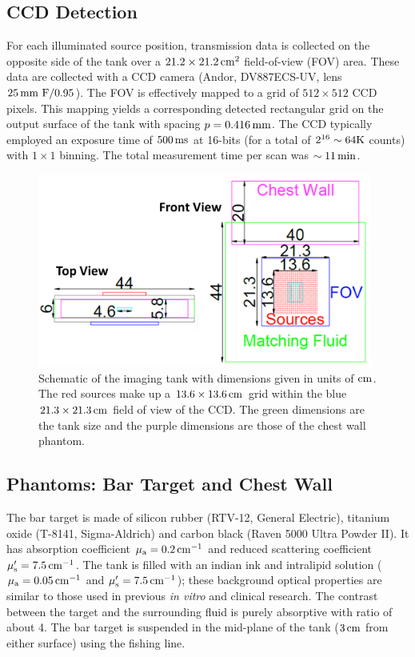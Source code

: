 \subsection{CCD Detection}
For each illuminated source position, transmission data is collected on the opposite side of the tank over a $21.2\times 21.2\,{\rm cm}^2$ field-of-view (FOV) area. These data are collected with a CCD camera (Andor, DV887ECS-UV, lens $25\,{\rm mm}\ {\rm F}/0.95$). The FOV is effectively mapped to a grid of $512\times 512$ CCD pixels. This mapping yields a corresponding detected rectangular grid on the output surface of the tank with spacing $p=0.416\,{\rm mm}$. The CCD typically employed an exposure time of $500\,\rm{ms}$ at 16-bits (for a total of $2^{16}\sim64\rm{K}$ counts) with $1\times1$ binning. The total measurement time per scan was $\sim 11\,\rm{min}$.
\begin{figure}[h]
\centering
\includegraphics[width=11cm]{./figures/3_Chestwall/chestwalldim.png}
\caption[Schematic of the imaging tank with dimensions given in units of $\rm{cm}$]{Schematic of the imaging tank with dimensions given in units of $\rm{cm}$. The red sources make up a $13.6\times 13.6\,\rm{cm}$ grid within the blue $21.3\times 21.3\,\rm{cm}$ field of view of the CCD. The green dimensions are the tank size and the purple dimensions are those of the chest wall phantom.}
\label{fig:chestwalldim}
\end{figure}

\subsection{Phantoms: Bar Target and Chest Wall}
\label{sec:chestphant}
The bar target is made of silicon rubber (RTV-12, General Electric), titanium oxide (T-8141, Sigma-Aldrich) and carbon black (Raven 5000 Ultra Powder II). It has absorption coefficient $\mu_{\rm a}=0.2\,{\rm cm}^{-1}$ and reduced scattering coefficient $\mu_{\rm s}^\prime = 7.5\,{\rm cm}^{-1}$.  The tank is filled with an indian ink and intralipid solution ($\mu_{\rm a} = 0.05\,{\rm cm}^{-1}$ and $\mu_{\rm s}^\prime = 7.5\,{\rm cm}^{-1}$); these background optical properties are similar to those used in previous {\em in vitro} and clinical research. The contrast between the target and the surrounding fluid is purely absorptive with ratio of about 4. The bar target is suspended in the mid-plane of the tank ($3\,{\rm cm}$ from either surface) using the fishing line. 

